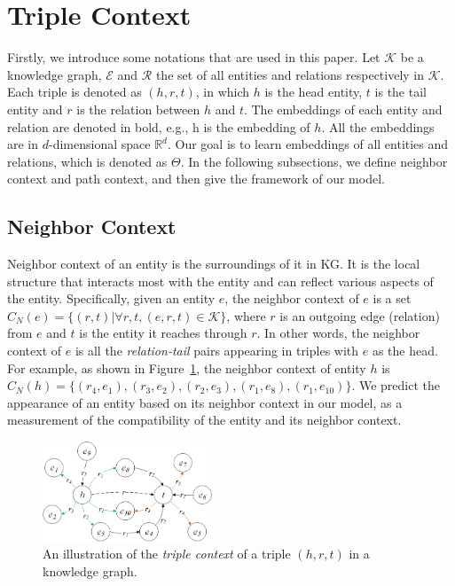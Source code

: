 \section{Triple Context}\label{sec:pre}
Firstly, we introduce some notations that are used in this paper. Let $\mathcal{K}$ be a knowledge graph, $\mathcal{E}$ and $\mathcal{R}$ the set of all entities and relations respectively in $\mathcal{K}$. Each triple is denoted as $(h, r, t)$, in which $h$ is the head entity, $t$ is the tail entity and $r$ is the relation between $h$ and $t$. The embeddings of each entity and relation are denoted in bold, e.g., $\bm{\mathrm{h}}$ is the embedding of $h$. All the embeddings are in $d$-dimensional space $\mathbb{R}^d$. Our goal is to learn embeddings of all entities and relations, which is denoted as $\Theta$. In the following subsections, we define neighbor context and path context, and then give the framework of our model.

\subsection{Neighbor Context}
Neighbor context of an entity is the surroundings of it in KG. It is the local structure that interacts most with the entity and can reflect various aspects of the entity. Specifically, given an entity $e$, the neighbor context of $e$ is a set $C_N(e)=\{(r,t)|\forall r, t, (e,r,t)\in\mathcal{K}\}$, where $r$ is an outgoing edge (relation) from $e$ and $t$ is the entity it reaches through $r$. In other words, the neighbor context of $e$ is all the \textit{relation-tail} pairs appearing in triples with $e$ as the head. For example, as shown in Figure~\ref{pic1}, the neighbor context of entity $h$ is $C_N(h)=\{(r_4, e_1), (r_3, e_2), (r_2, e_3), (r_1, e_8), (r_1, e_{10})\}$. We predict the appearance of an entity based on its neighbor context in our model, as a measurement of the compatibility of the entity and its neighbor context.

\begin{figure}
  \includegraphics[width=0.45\textwidth]{pic1.png}
  \caption{An illustration of the \emph{triple context} of a triple $(h,r,t)$ in a knowledge graph.}
  \label{pic1}
\end{figure}


